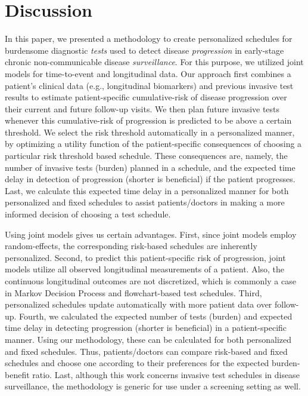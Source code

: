 \section{Discussion}
\label{c4:sec:discussion}
In this paper, we presented a methodology to create personalized schedules for burdensome diagnostic \textit{tests} used to detect disease \textit{progression} in early-stage chronic non-communicable disease \textit{surveillance}. For this purpose, we utilized joint models for time-to-event and longitudinal data. Our approach first combines a patient's clinical data (e.g., longitudinal biomarkers) and previous invasive test results to estimate patient-specific cumulative-risk of disease progression over their current and future follow-up visits. We then plan future invasive tests whenever this cumulative-risk of progression is predicted to be above a certain threshold. We select the risk threshold automatically in a personalized manner, by optimizing a utility function of the patient-specific consequences of choosing a particular risk threshold based schedule. These consequences are, namely, the number of invasive tests (burden) planned in a schedule, and the expected time delay in detection of progression (shorter is beneficial) if the patient progresses. Last, we calculate this expected time delay in a personalized manner for both personalized and fixed schedules to assist patients/doctors in making a more informed decision of choosing a test schedule.

Using joint models gives us certain advantages. First, since joint models employ random-effects, the corresponding risk-based schedules are inherently personalized. Second, to predict this patient-specific risk of progression, joint models utilize all observed longitudinal measurements of a patient. Also, the continuous longitudinal outcomes are not discretized, which is commonly a case in Markov Decision Process and flowchart-based test schedules. Third, personalized schedules update automatically with more patient data over follow-up. Fourth, we calculated the expected number of tests (burden) and expected time delay in detecting progression (shorter is beneficial) in a patient-specific manner. Using our methodology, these can be calculated for both personalized and fixed schedules. Thus, patients/doctors can compare risk-based and fixed schedules and choose one according to their preferences for the expected burden-benefit ratio. Last, although this work concerns invasive test schedules in disease surveillance, the methodology is generic for use under a screening setting as well.

